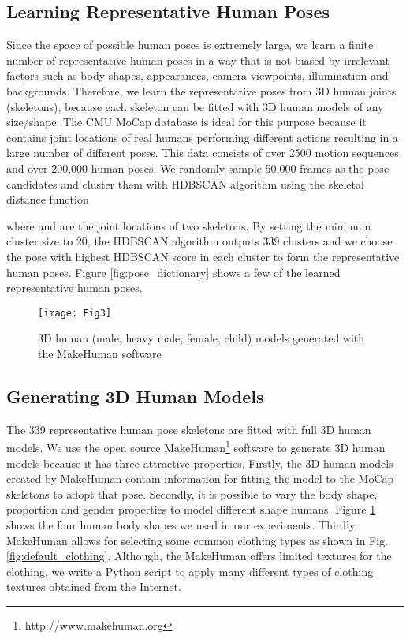 \documentclass[twocolumn]{svjour3}          \smartqed  \usepackage{graphicx}
\begin{document}
\subsection{Learning Representative Human Poses}

Since the space of possible human poses is extremely large, we learn a finite number of representative human poses in a way that is not biased by irrelevant factors such as body shapes, appearances, camera viewpoints, illumination and backgrounds. Therefore, we learn the representative poses from 3D human joints (skeletons), because each skeleton can be fitted with 3D human models of any size/shape. The CMU MoCap database is ideal for this purpose because it contains joint locations of real humans performing different actions resulting in a large number of different poses. This data consists of over 2500 motion sequences and over 200,000 human poses. We randomly sample 50,000 frames as the pose candidates and cluster them with HDBSCAN algorithm \citep{mcinnes2017hdbscan} using the skeletal distance function \citep{shakhnarovich2005learning}  
 
where  and  are the  joint locations of two skeletons. By setting the minimum cluster size to 20, the HDBSCAN algorithm outputs 339 clusters and we choose the pose with highest HDBSCAN score in each cluster to form the representative human poses. Figure \ref{fig:pose_dictionary} shows a few of the learned representative human poses.


\begin{figure}[t]
\centering
\texttt{[image: Fig3]}
\caption{3D human (male, heavy male, female, child) models generated with the MakeHuman software}
\label{fig:3D_humans}
\end{figure}

\vspace{-2mm}
\subsection{Generating 3D Human Models}
The 339 representative human pose skeletons are fitted with full 3D human models. We use the open source MakeHuman\footnote{http://www.makehuman.org} software to generate 3D human models because it has three attractive properties. Firstly, the 3D human models created by MakeHuman contain information for fitting the model to the MoCap skeletons to adopt that pose. Secondly, it is possible to vary the body shape, proportion and gender properties to model different shape humans. Figure \ref{fig:3D_humans} shows the four human body shapes we used in our experiments. Thirdly, MakeHuman allows for selecting some common clothing types as shown in Fig. \ref{fig:default_clothing}. Although, the MakeHuman offers limited textures for the clothing, we write a Python script to apply many different types of clothing textures obtained from the Internet.
\end{document}
